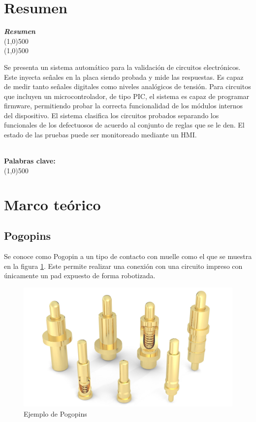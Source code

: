 \documentclass[12pt,letterpaper]{article}     %
\makeatletter
\newcounter{resumen}
\newenvironment{resumen}
{	
	\begin{center}
	\begin{minipage}[t]{500 pt}
	\vspace{5mm}
	\emph{\textbf{Resumen}}
	\\[-2mm]
	\line(1,0){500}
	\\[-4.25 mm]
	\line(1,0){500}
	\vspace{\baselineskip}
}
{
	\normalsize
	\\[2mm]
	\footnotesize\textbf{Palabras clave: \footnotesize\@palabras}
	\\[-2mm]
	\line(1,0){500}
	\\[0.5cm]
	\end{minipage}
	\end{center}
}
\makeatother
\begin{document}
\newpage
\section{Resumen}
\begin{resumen}
	Se presenta un sistema automático para la validación de circuitos electrónicos.
	Este inyecta señales en la placa siendo probada y mide las respuestas.
	Es capaz de medir tanto señales digitales como niveles analógicos de tensión.
	Para circuitos que incluyen un microcontrolador, de tipo PIC, el sistema es capaz de programar
	firmware, permitiendo probar la correcta funcionalidad de los módulos internos
	del dispositivo. El sistema clasifica los circuitos probados separando los
	funcionales de los defectuosos de acuerdo al conjunto de reglas que se le den.
	El estado de las pruebas puede ser monitoreado mediante un HMI.
\end{resumen} 
% 
\section{Marco teórico}
\label{Marco teórico}

\subsection{Pogopins}

Se conoce como Pogopin a un tipo de contacto con muelle como el que se muestra en la figura \ref{fig:pogopin}.
Este permite realizar una conexión con una circuito impreso con únicamente un pad expuesto de forma robotizada.

\begin{figure}[!ht]
\centering
\includegraphics[]{imagenes/pogopin.jpg}
\caption{Ejemplo de Pogopins}
\label{fig:pogopin}
\end{figure}
\end{document}
